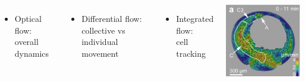 \documentclass{beamer}
\begin{document}
\begin{frame}
\begin{columns}
        \vfill
    \begin{itemize}
    \item Optical flow: overall dynamics
    \end{itemize}        
    \vfill
    \begin{itemize}
    \item Differential flow: collective vs individual movement
    \end{itemize}
    \vfill
    \begin{itemize}
    \item Integrated flow:\\ cell tracking
    \end{itemize}        
    \def\imw{\textwidth}
    \includegraphics[width=\imw]{figures/analysis-overview/flow}

\end{columns}
\end{frame}
\end{document}
